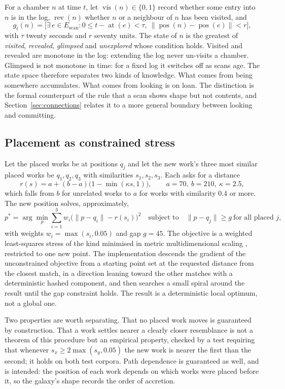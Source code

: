 \documentclass[11pt]{article}
\theoremstyle{remark}
\begin{document}
For a chamber $n$ at time $t$, let $\operatorname{vis}(n) \in \{0,1\}$ record whether some entry into $n$ is in the log, $\operatorname{rev}(n)$ whether $n$ or a neighbour of $n$ has been visited, and
\[
g_t(n) = \bigl[\exists\, e \in E_{\mathrm{scan}} : 0 \le t - \operatorname{at}(e) < \tau,\ \lVert \operatorname{pos}(n) - \operatorname{pos}(e) \rVert < r \bigr],
\]
with $\tau$ twenty seconds and $r$ seventy units. The state of $n$ is the greatest of \emph{visited}, \emph{revealed}, \emph{glimpsed} and \emph{unexplored} whose condition holds. Visited and revealed are monotone in the log: extending the log never un-visits a chamber. Glimpsed is not monotone in time: for a fixed log it switches off as scans age. The state space therefore separates two kinds of knowledge. What comes from being somewhere accumulates. What comes from looking is on loan. The distinction is the formal counterpart of the rule that a scan shows shape but not contents, and Section~\ref{sec:connections} relates it to a more general boundary between looking and committing.

\subsection{Placement as constrained stress}

Let the placed works be at positions $q_j$ and let the new work's three most similar placed works be $q_1, q_2, q_3$ with similarities $s_1, s_2, s_3$. Each asks for a distance
\[
r(s) = a + (b - a)\bigl(1 - \min(\kappa s, 1)\bigr), \qquad a = 70,\ b = 210,\ \kappa = 2.5,
\]
which falls from $b$ for unrelated works to $a$ for works with similarity $0.4$ or more. The new position solves, approximately,
\[
p^\ast = \arg\min_{p} \sum_{i=1}^{3} w_i \bigl( \lVert p - q_i \rVert - r(s_i) \bigr)^2
\quad \text{subject to} \quad \lVert p - q_j \rVert \ge g \ \text{for all placed } j,
\]
with weights $w_i = \max(s_i, 0.05)$ and gap $g = 45$. The objective is a weighted least-squares stress of the kind minimised in metric multidimensional scaling \cite{kruskal1964}, restricted to one new point. The implementation descends the gradient of the unconstrained objective from a starting point set at the requested distance from the closest match, in a direction leaning toward the other matches with a deterministic hashed component, and then searches a small spiral around the result until the gap constraint holds. The result is a deterministic local optimum, not a global one.

Two properties are worth separating. That no placed work moves is guaranteed by construction. That a work settles nearer a clearly closer resemblance is not a theorem of this procedure but an empirical property, checked by a test requiring that whenever $s_x \ge 2\max(s_y, 0.05)$ the new work is nearer the first than the second; it holds on both test corpora. Path dependence is guaranteed as well, and is intended: the position of each work depends on which works were placed before it, so the galaxy's shape records the order of accretion.
\end{document}
